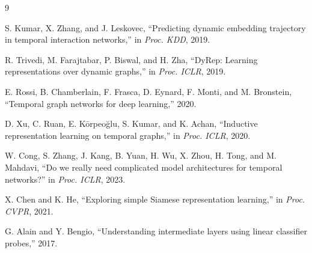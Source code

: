 \documentclass[conference]{IEEEtran}
\begin{document}
\begin{thebibliography}{9}

S. Kumar, X. Zhang, and J. Leskovec, ``Predicting dynamic embedding trajectory
in temporal interaction networks,'' in \emph{Proc. KDD}, 2019.

R. Trivedi, M. Farajtabar, P. Biswal, and H. Zha, ``DyRep: Learning
representations over dynamic graphs,'' in \emph{Proc. ICLR}, 2019.

E. Rossi, B. Chamberlain, F. Frasca, D. Eynard, F. Monti, and M. Bronstein,
``Temporal graph networks for deep learning,'' 2020.

D. Xu, C. Ruan, E. K\={o}rpeo\u{g}lu, S. Kumar, and K. Achan, ``Inductive
representation learning on temporal graphs,'' in \emph{Proc. ICLR}, 2020.

W. Cong, S. Zhang, J. Kang, B. Yuan, H. Wu, X. Zhou, H. Tong, and M. Mahdavi,
``Do we really need complicated model architectures for temporal networks?''
in \emph{Proc. ICLR}, 2023.

X. Chen and K. He, ``Exploring simple Siamese representation learning,'' in
\emph{Proc. CVPR}, 2021.

G. Alain and Y. Bengio, ``Understanding intermediate layers using linear
classifier probes,'' 2017.

\end{thebibliography}
\end{document}
